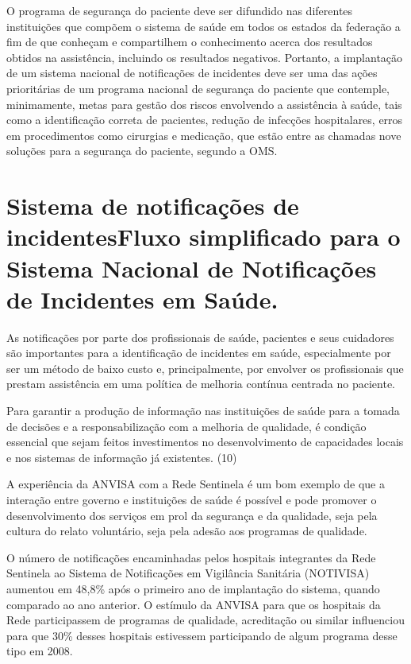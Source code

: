 \documentclass{article}
\begin{document}
O programa de segurança do paciente deve ser difundido nas diferentes
instituições que
compõem o sistema de saúde em todos os estados da federação a fim de que
conheçam e
compartilhem o conhecimento acerca dos resultados obtidos na assistência,
incluindo os
resultados negativos. Portanto, a implantação de um sistema nacional de
notificações de
incidentes deve ser uma das ações prioritárias de um programa nacional de
segurança do
paciente que contemple, minimamente, metas para gestão dos riscos envolvendo a
assistência à
saúde, tais como a identificação correta de pacientes, redução de infecções
hospitalares,
erros em procedimentos como cirurgias e medicação, que estão entre as chamadas
nove soluções
para a segurança do paciente, segundo a OMS.

\section{Sistema de notificações de incidentesFluxo simplificado para o Sistema
Nacional de Notificações de Incidentes em
Saúde.}

As notificações por parte dos profissionais de saúde, pacientes e seus
cuidadores são
importantes para a identificação de incidentes em saúde, especialmente por ser
um método de
baixo custo e, principalmente, por envolver os profissionais que prestam
assistência em uma
política de melhoria contínua centrada no paciente.

Para garantir a produção de informação nas instituições de saúde para a tomada
de decisões
e a responsabilização com a melhoria de qualidade, é condição essencial que
sejam feitos
investimentos no desenvolvimento de capacidades locais e nos sistemas de
informação já
existentes. (10)

A experiência da ANVISA com a Rede Sentinela é um bom exemplo de que a interação
entre
governo e instituições de saúde é possível e pode promover o desenvolvimento dos
serviços em
prol da segurança e da qualidade, seja pela cultura do relato voluntário, seja
pela adesão
aos programas de qualidade.

O número de notificações encaminhadas pelos hospitais integrantes da Rede
Sentinela ao
Sistema de Notificações em Vigilância Sanitária (NOTIVISA) aumentou em 48,8\%
após o primeiro
ano de implantação do sistema, quando comparado ao ano anterior. O estímulo da
ANVISA para
que os hospitais da Rede participassem de programas de qualidade, acreditação ou
similar
influenciou para que 30\% desses hospitais estivessem participando de algum
programa desse
tipo em 2008.
\end{document}
